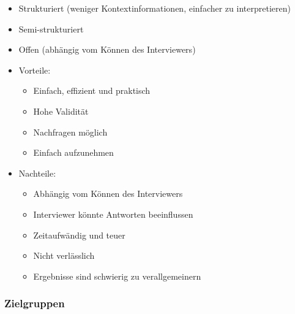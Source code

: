 \begin{itemize}
\item
  Strukturiert (weniger Kontextinformationen, einfacher zu
  interpretieren)
\item
  Semi-strukturiert
\item
  Offen (abhängig vom Können des Interviewers)
\item
  Vorteile:

  \begin{itemize}
  \item
    Einfach, effizient und praktisch
  \item
    Hohe Validität
  \item
    Nachfragen möglich
  \item
    Einfach aufzunehmen
  \end{itemize}
\item
  Nachteile:

  \begin{itemize}
  \item
    Abhängig vom Können des Interviewers
  \item
    Interviewer könnte Antworten beeinflussen
  \item
    Zeitaufwändig und teuer
  \item
    Nicht verlässlich
  \item
    Ergebnisse sind schwierig zu verallgemeinern
  \end{itemize}
\end{itemize}

\subsubsection{Zielgruppen}

